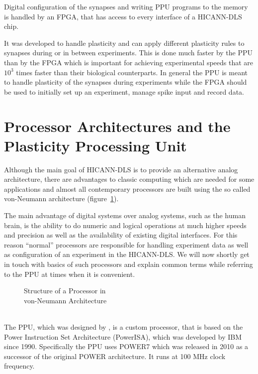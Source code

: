Digital configuration of the synapses and writing \ac{PPU} programs to the memory is handled by an \ac{FPGA}, that has access to every interface of a \ac{HICANN-DLS} chip.

It was developed to handle plasticity and can apply different plasticity rules to synapses during or in between experiments.
This is done much faster by the \ac{PPU} than by the \ac{FPGA} which is important for achieving experimental speeds that are $10^{3}$ times faster than their biological counterparts.
In general the \ac{PPU} is meant to handle plasticity of the synapses during experiments while the \ac{FPGA} should be used to initially set up an experiment, manage spike input and record data.


\section{Processor Architectures and the Plasticity Processing Unit}
Although the main goal of \ac{HICANN-DLS} is to provide an alternative analog architecture, there are advantages to classic computing which are needed for some applications and almost all contemporary processors are built using the so called von-Neumann architecture (figure~\ref{fig:processor}). 

The main advantage of digital systems over analog systems, such as the human brain, is the ability to do numeric and logical operations at much higher speeds and precision as well as the availability of existing digital interfaces.
For this reason ``normal'' processors are responsible for handling experiment data as well as configuration of an experiment in the \ac{HICANN-DLS}.
We will now shortly get in touch with basics of such processors and explain common terms while referring to the \ac{PPU} at times when it is convenient.
\begin{figure}
\captionsetup{format=plain, indention=.6cm, labelsep=newline,singlelinecheck=false}
    \centering
        \vspace*{17mm}
        
        \vspace*{-10mm}
        \caption{\label{fig:processor} Structure of a Processor in \\ von-Neumann Architecture}
\end{figure}
\\
The \ac{PPU}, which was designed by \citeauthor{PPU}, is a custom processor, that is based on the Power Instruction Set Architecture (PowerISA), which was developed by IBM since 1990. 
Specifically the \ac{PPU} uses POWER7 which was released in 2010 as a successor of the original POWER architecture.
It runs at 100 MHz clock frequency.

